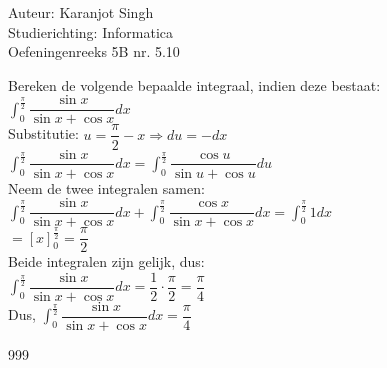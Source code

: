 \documentclass[a4paper]{article}
\begin{document}
\noindent \large Auteur: Karanjot Singh \\
\noindent \large Studierichting: Informatica \\
\noindent \large Oefeningenreeks 5B nr. 5.10 \\

\normalsize

Bereken de volgende bepaalde integraal, indien deze bestaat: \\

$\displaystyle\int_{0}^{\tfrac{\pi}{2}} \dfrac{\sin x}{\sin x + \cos x} dx$ \\

Substitutie: $u = \dfrac{\pi}{2} - x \Rightarrow du = -dx$ \\

$\displaystyle\int_{0}^{\tfrac{\pi}{2}} \dfrac{\sin x}{\sin x + \cos x} dx = \displaystyle\int_{0}^{\tfrac{\pi}{2}} \dfrac{\cos u}{\sin u + \cos u} du$ \\

Neem de twee integralen samen: \\

$\displaystyle\int_{0}^{\tfrac{\pi}{2}} \dfrac{\sin x}{\sin x + \cos x} dx + \displaystyle\int_{0}^{\tfrac{\pi}{2}} \dfrac{\cos x}{\sin x + \cos x} dx = \displaystyle\int_{0}^{\tfrac{\pi}{2}} 1 dx$ \\

$= \left[ x \right]_0^{\tfrac{\pi}{2}} = \dfrac{\pi}{2}$ \\

Beide integralen zijn gelijk, dus: \\

$\displaystyle\int_{0}^{\tfrac{\pi}{2}} \dfrac{\sin x}{\sin x + \cos x} dx = \dfrac{1}{2} \cdot \dfrac{\pi}{2} = \dfrac{\pi}{4}$ \\

Dus, $\displaystyle\int_{0}^{\tfrac{\pi}{2}} \dfrac{\sin x}{\sin x + \cos x} dx = \dfrac{\pi}{4}$ \\

\begin{thebibliography}{999}
\end{thebibliography}
\end{document}
